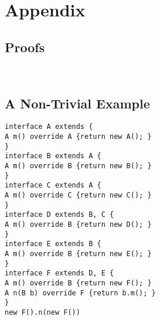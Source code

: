 \section{Appendix}

\subsection{Proofs}~\label{appendix_proof}


\subsection{A Non-Trivial Example}

\begin{lstlisting}
interface A extends {
A m() override A {return new A(); }
}
interface B extends A {
A m() override B {return new B(); }
}
interface C extends A {
A m() override C {return new C(); }
}
interface D extends B, C {
A m() override B {return new D(); }
}
interface E extends B {
A m() override B {return new E(); }
}
interface F extends D, E {
A m() override B {return new F(); } 
A n(B b) override F {return b.m(); }
}
new F().n(new F())
\end{lstlisting}

